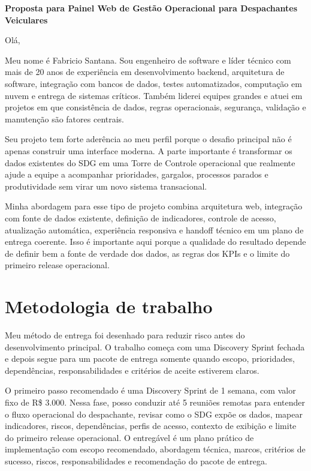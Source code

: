 \documentclass[11pt,a4paper]{article}
\begin{document}
\begin{center}
{\LARGE\bfseries Proposta para Painel Web de Gestão Operacional para Despachantes Veiculares}
\end{center}
\vspace{0.5em}

Olá,\par

Meu nome é Fabricio Santana. Sou engenheiro de software e líder técnico com mais de 20 anos de experiência em desenvolvimento backend, arquitetura de software, integração com bancos de dados, testes automatizados, computação em nuvem e entrega de sistemas críticos. Também liderei equipes grandes e atuei em projetos em que consistência de dados, regras operacionais, segurança, validação e manutenção são fatores centrais.\par

Seu projeto tem forte aderência ao meu perfil porque o desafio principal não é apenas construir uma interface moderna. A parte importante é transformar os dados existentes do SDG em uma Torre de Controle operacional que realmente ajude a equipe a acompanhar prioridades, gargalos, processos parados e produtividade sem virar um novo sistema transacional.\par

Minha abordagem para esse tipo de projeto combina arquitetura web, integração com fonte de dados existente, definição de indicadores, controle de acesso, atualização automática, experiência responsiva e handoff técnico em um plano de entrega coerente. Isso é importante aqui porque a qualidade do resultado depende de definir bem a fonte de verdade dos dados, as regras dos KPIs e o limite do primeiro release operacional.\par

\section*{Metodologia de trabalho}

Meu método de entrega foi desenhado para reduzir risco antes do desenvolvimento principal. O trabalho começa com uma Discovery Sprint fechada e depois segue para um pacote de entrega somente quando escopo, prioridades, dependências, responsabilidades e critérios de aceite estiverem claros.\par

O primeiro passo recomendado é uma Discovery Sprint de 1 semana, com valor fixo de R\$ 3.000. Nessa fase, posso conduzir até 5 reuniões remotas para entender o fluxo operacional do despachante, revisar como o SDG expõe os dados, mapear indicadores, riscos, dependências, perfis de acesso, contexto de exibição e limite do primeiro release operacional. O entregável é um plano prático de implementação com escopo recomendado, abordagem técnica, marcos, critérios de sucesso, riscos, responsabilidades e recomendação do pacote de entrega.\par
\end{document}
